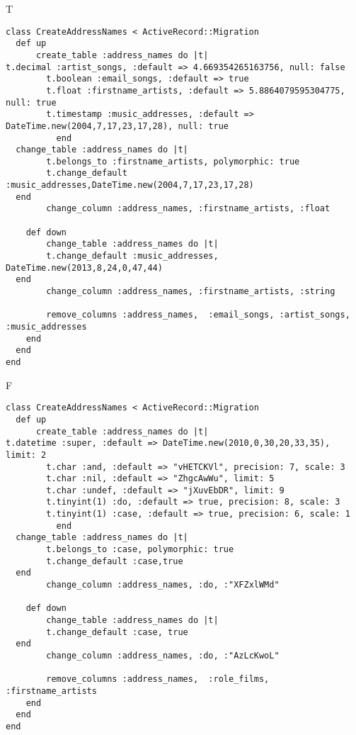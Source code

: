 T
\begin{verbatim}
class CreateAddressNames < ActiveRecord::Migration
  def up
	  create_table :address_names do |t|
t.decimal :artist_songs, :default => 4.669354265163756, null: false
		t.boolean :email_songs, :default => true
		t.float :firstname_artists, :default => 5.8864079595304775, null: true
		t.timestamp :music_addresses, :default => DateTime.new(2004,7,17,23,17,28), null: true
		  end
  change_table :address_names do |t|
		t.belongs_to :firstname_artists, polymorphic: true
 		t.change_default :music_addresses,DateTime.new(2004,7,17,23,17,28)
  end
 		change_column :address_names, :firstname_artists, :float
   
	def down
		change_table :address_names do |t|
		t.change_default :music_addresses, DateTime.new(2013,8,24,0,47,44)
  end
 		change_column :address_names, :firstname_artists, :string
   
		remove_columns :address_names,  :email_songs, :artist_songs, :music_addresses 
    end 
  end
end

\end{verbatim}

F
\begin{verbatim}
class CreateAddressNames < ActiveRecord::Migration
  def up
	  create_table :address_names do |t|
t.datetime :super, :default => DateTime.new(2010,0,30,20,33,35), limit: 2
		t.char :and, :default => "vHETCKVl", precision: 7, scale: 3
		t.char :nil, :default => "ZhgcAwWu", limit: 5
		t.char :undef, :default => "jXuvEbDR", limit: 9
		t.tinyint(1) :do, :default => true, precision: 8, scale: 3
		t.tinyint(1) :case, :default => true, precision: 6, scale: 1
		  end
  change_table :address_names do |t|
		t.belongs_to :case, polymorphic: true
 		t.change_default :case,true
  end
 		change_column :address_names, :do, :"XFZxlWMd"
   
	def down
		change_table :address_names do |t|
		t.change_default :case, true
  end
 		change_column :address_names, :do, :"AzLcKwoL"
   
		remove_columns :address_names,  :role_films, :firstname_artists 
    end 
  end
end

\end{verbatim}

